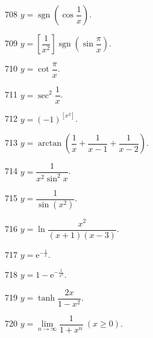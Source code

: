 \begin{prob}[S]{708}
$y = \operatorname{sgn}\left(\cos \dfrac{1}{x}\right)$.
\end{prob}

\begin{prob}[S]{709}
$y = \left[\dfrac{1}{x^2}\right] \operatorname{sgn}\left(\sin \dfrac{\pi}{x}\right)$.
\end{prob}

\begin{prob}[S]{710}
$y = \cot \dfrac{\pi}{x}$.
\end{prob}

\begin{prob}[S]{711}
$y = \sec^2 \dfrac{1}{x}$.
\end{prob}

\begin{prob}[S]{712}
$y = (-1)^{[x^2]}$.
\end{prob}

\begin{prob}[S]{713}
$y = \arctan\left(\dfrac{1}{x} + \dfrac{1}{x - 1} + \dfrac{1}{x - 2}\right)$.
\end{prob}

\begin{prob}[S]{714}
$y = \dfrac{1}{x^2 \sin^2 x}$.
\end{prob}

\begin{prob}[S]{715}
$y = \dfrac{1}{\sin(x^2)}$.
\end{prob}

\begin{prob}[S]{716}
$y = \ln \dfrac{x^2}{(x + 1)(x - 3)}$.
\end{prob}

\begin{prob}[S]{717}
$y = \mathrm{e}^{-\frac{1}{x}}$.
\end{prob}

\begin{prob}[S]{718}
$y = 1 - \mathrm{e}^{-\frac{1}{x^2}}$.
\end{prob}

\begin{prob}[S]{719}
$y = \tanh \dfrac{2x}{1 - x^2}$.
\end{prob}


\begin{prob}[M]{720}
$y = \lim\limits_{n \to \infty} \dfrac{1}{1 + x^n} \ (x \geqslant 0)$.
\end{prob}

